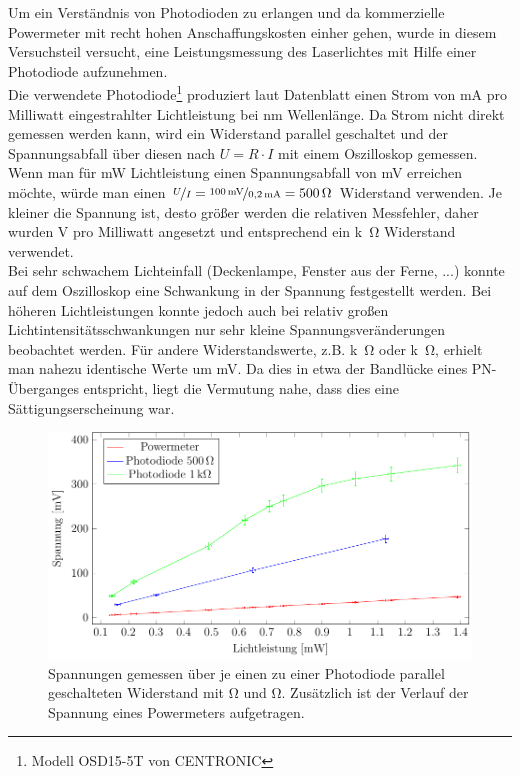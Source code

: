 
Um ein Verständnis von Photodioden zu erlangen und da kommerzielle Powermeter mit recht hohen Anschaffungskosten einher gehen, wurde in diesem Versuchsteil versucht, eine Leistungsmessung des Laserlichtes mit Hilfe einer Photodiode aufzunehmen.\\

Die verwendete Photodiode\footnote{Modell OSD15-5T von CENTRONIC\cite{farnell.com_osd15-5t_????}} produziert laut Datenblatt einen Strom von \unit[0,18-0,21]{mA} pro Milliwatt eingestrahlter Lichtleistung bei \unit[436]{nm} Wellenlänge. Da Strom nicht direkt gemessen werden kann, wird ein Widerstand parallel geschaltet und der Spannungsabfall über diesen nach $U=R\cdot I$ mit einem Oszilloskop gemessen. Wenn man für \unit[1]{mW} Lichtleistung einen Spannungsabfall von \unit[100]{mV} erreichen möchte, würde man einen $ \nicefrac{U}{I}=\nicefrac{\unit[100]{mV}}{\unit[0,2]{mA}}=\unit[500]{\ohm}$ Widerstand verwenden. Je kleiner die Spannung ist, desto größer werden die relativen Messfehler, daher wurden \unit[4]{V} pro Milliwatt angesetzt und entsprechend ein \unit[20]{k\ohm} Widerstand verwendet.\\

Bei sehr schwachem Lichteinfall (Deckenlampe, Fenster aus der Ferne, ...) konnte auf dem Oszilloskop eine Schwankung in der Spannung festgestellt werden. Bei höheren Lichtleistungen konnte jedoch auch bei relativ großen Lichtintensitätsschwankungen nur sehr kleine Spannungsveränderungen beobachtet werden. Für andere Widerstandswerte, z.B. \unit[10]{k\ohm} oder \unit[100]{k\ohm}, erhielt man nahezu identische Werte um \unit[440]{mV}. Da dies in etwa der Bandlücke eines PN-Überganges entspricht, liegt die Vermutung nahe, dass dies eine Sättigungserscheinung war.

\begin{figure}[ht]
	\centering
	\includegraphics[width=1\linewidth]{graphs/fotodiode/diode.pdf}
	\caption[Vermessung einer Photodiode]{
		Spannungen gemessen über je einen zu einer Photodiode parallel geschalteten Widerstand mit \unit[500]{\ohm} und \unit[1000]{\ohm}. Zusätzlich ist der Verlauf der Spannung eines Powermeters aufgetragen.
	}
	\label{fig:photodiode}
\end{figure}

